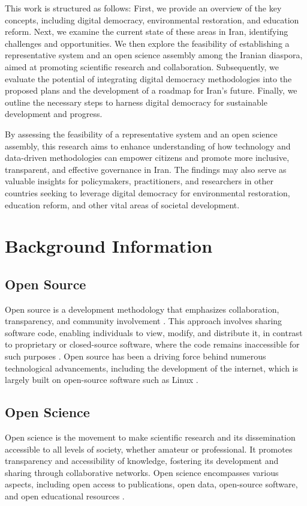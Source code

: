 \documentclass{IEEEtran}
\begin{document}
This work is structured as follows: First, we provide an overview of the key concepts, including digital democracy, environmental restoration, and education reform. Next, we examine the current state of these areas in Iran, identifying challenges and opportunities. We then explore the feasibility of establishing a representative system and an open science assembly among the Iranian diaspora, aimed at promoting scientific research and collaboration. Subsequently, we evaluate the potential of integrating digital democracy methodologies into the proposed plans and the development of a roadmap for Iran's future. Finally, we outline the necessary steps to harness digital democracy for sustainable development and progress.

By assessing the feasibility of a representative system and an open science assembly, this research aims to enhance understanding of how technology and data-driven methodologies can empower citizens and promote more inclusive, transparent, and effective governance in Iran. The findings may also serve as valuable insights for policymakers, practitioners, and researchers in other countries seeking to leverage digital democracy for environmental restoration, education reform, and other vital areas of societal development.

\section{Background Information}

\subsection{Open Source}
Open source is a development methodology that emphasizes collaboration, transparency, and community involvement \cite{dibona1999opensource}. This approach involves sharing software code, enabling individuals to view, modify, and distribute it, in contrast to proprietary or closed-source software, where the code remains inaccessible for such purposes \cite{dibona1999opensource}. Open source has been a driving force behind numerous technological advancements, including the development of the internet, which is largely built on open-source software such as Linux \cite{dibona1999opensource}.

\subsection{Open Science}
Open science is the movement to make scientific research and its dissemination accessible to all levels of society, whether amateur or professional. It promotes transparency and accessibility of knowledge, fostering its development and sharing through collaborative networks. Open science encompasses various aspects, including open access to publications, open data, open-source software, and open educational resources \cite{nielsen2011reinventing}.
\end{document}
